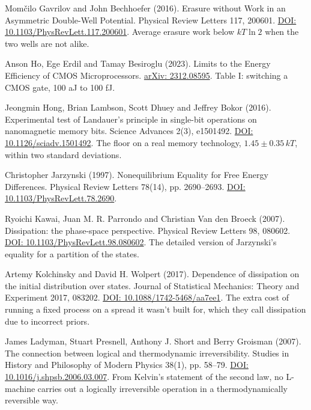 \documentclass[11pt,twoside]{article}
\theoremstyle{thielethm}
\theoremstyle{thieledef}
\theoremstyle{thieledef}
\theoremstyle{thieledef}
\theoremstyle{thielethm}
\theoremstyle{thieleobs}
\theoremstyle{thielethm}
\begin{document}
\noindent Mom\v{c}ilo Gavrilov and John Bechhoefer (2016). Erasure without Work in an Asymmetric Double-Well Potential. Physical Review Letters 117, 200601. \href{https://doi.org/10.1103/PhysRevLett.117.200601}{DOI: 10.1103/PhysRevLett.117.200601}. Average erasure work below $kT\ln 2$ when the two wells are not alike.
\par\medskip

\noindent Anson Ho, Ege Erdil and Tamay Besiroglu (2023). Limits to the Energy Efficiency of CMOS Microprocessors. \href{https://arxiv.org/abs/2312.08595}{arXiv: 2312.08595}. Table I: switching a CMOS gate, 100 aJ to 100 fJ.
\par\medskip

\noindent Jeongmin Hong, Brian Lambson, Scott Dhuey and Jeffrey Bokor (2016). Experimental test of Landauer's principle in single-bit operations on nanomagnetic memory bits. Science Advances 2(3), e1501492. \href{https://doi.org/10.1126/sciadv.1501492}{DOI: 10.1126/sciadv.1501492}. The floor on a real memory technology, $1.45 \pm 0.35\,kT$, within two standard deviations.
\par\medskip

\noindent Christopher Jarzynski (1997). Nonequilibrium Equality for Free Energy Differences. Physical Review Letters 78(14), pp. 2690--2693. \href{https://doi.org/10.1103/PhysRevLett.78.2690}{DOI: 10.1103/PhysRevLett.78.2690}.
\par\medskip

\noindent Ryoichi Kawai, Juan M. R. Parrondo and Christian Van den Broeck (2007). Dissipation: the phase-space perspective. Physical Review Letters 98, 080602. \href{https://doi.org/10.1103/PhysRevLett.98.080602}{DOI: 10.1103/PhysRevLett.98.080602}. The detailed version of Jarzynski's equality for a partition of the states.
\par\medskip

\noindent Artemy Kolchinsky and David H. Wolpert (2017). Dependence of dissipation on the initial distribution over states. Journal of Statistical Mechanics: Theory and Experiment 2017, 083202. \href{https://doi.org/10.1088/1742-5468/aa7ee1}{DOI: 10.1088/1742-5468/aa7ee1}. The extra cost of running a fixed process on a spread it wasn't built for, which they call dissipation due to incorrect priors.
\par\medskip

\noindent James Ladyman, Stuart Presnell, Anthony J. Short and Berry Groisman (2007). The connection between logical and thermodynamic irreversibility. Studies in History and Philosophy of Modern Physics 38(1), pp. 58--79. \href{https://doi.org/10.1016/j.shpsb.2006.03.007}{DOI: 10.1016/j.shpsb.2006.03.007}. From Kelvin's statement of the second law, no L-machine carries out a logically irreversible operation in a thermodynamically reversible way.
\par\medskip
\end{document}
